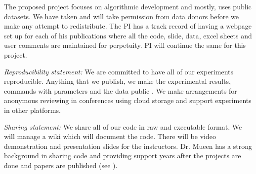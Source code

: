 The proposed project focuses on algorithmic development and mostly, uses public datasets. We have taken and will take permission from data donors before we make any attempt to redistribute. The PI has a track record of having a webpage set up for each of his publications \cite{page} where all the code, slide, data, excel sheets and user comments are maintained for perpetuity. PI will continue the same for this project.


\textit{Reproducibility statement:} We are committed to have all of our experiments reproducible. Anything that we publish, we make the experimental results, commands with parameters and the data public \cite{page}. We make arrangements for anonymous reviewing in conferences using cloud storage and support experiments in other platforms.

\textit{Sharing statement:} We share all of our code in raw and executable format. We will manage a wiki which will document the code. There will be video demonstration and presentation slides for the instructors. Dr. Mueen has a strong background in sharing code and providing support years after the projects are done and papers are published (see \cite{page}).

